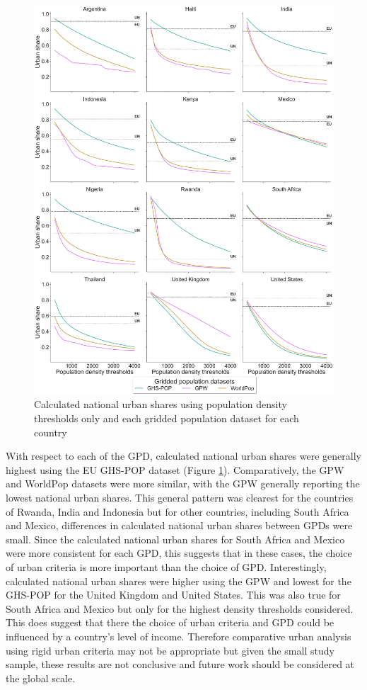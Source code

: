 \documentclass[review]{elsarticle}
\begin{document}
	
	\pagebreak
	\begin{figure}[H]
		\includegraphics[width=\textwidth]{national_urban_shares_portrait}
		\caption{Calculated national urban shares using population density thresholds only and each gridded population dataset for each country}
		\label{fig:urban_share}
	\end{figure}
	
	\pagebreak
	
	With respect to each of the GPD, calculated national urban shares were generally highest using the EU GHS-POP dataset (Figure \ref{fig:urban_share}).
	Comparatively, the GPW and WorldPop datasets were more similar, with the GPW generally reporting the lowest national urban shares.
	This general pattern was clearest for the countries of Rwanda, India and Indonesia but for other countries, including South Africa and Mexico, differences in calculated national urban shares between GPDs were small.
	Since the calculated national urban shares for South Africa and Mexico were more consistent for each GPD, this suggests that in these cases, the choice of urban criteria is more important than the choice of GPD. 
	Interestingly, calculated national urban shares were higher using the GPW and lowest for the GHS-POP for the United Kingdom and United States.
	This was also true for South Africa and Mexico but only for the highest density thresholds considered.
	This does suggest that there the choice of urban criteria and GPD could be influenced by a country's level of income.
	Therefore comparative urban analysis using rigid urban criteria may not be appropriate but given the small study sample, these results are not conclusive and future work should be considered at the global scale.
	
\end{document}
